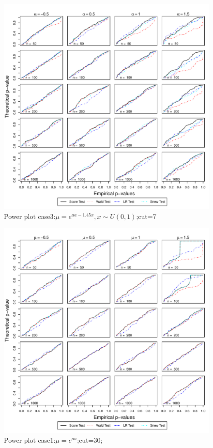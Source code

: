 \documentclass[11pt]{article}
\numberwithin{equation}{section}
\begin{document}
\begin{figure}
  \centering
  \includegraphics[width=\columnwidth]{./figure/q/q73.pdf}
  \caption{Power plot case3:$\mu=e^{aa-1.45x},x\sim U(0,1)$;cut=7}
\end{figure}


\begin{figure}
  \centering
  \includegraphics[width=\columnwidth]{./figure/q/q301.pdf}
  \caption{Power plot case1:$\mu=e^{aa}$;cut=30;}
\end{figure}
\end{document}
